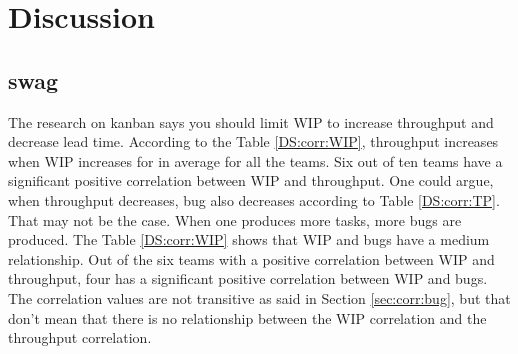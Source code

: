 \documentclass[UKenglish]{ifimaster}  %
\begin{document}
 
 \chapter{Discussion}
 \label{ch:discussion} 
 \section{swag}
 The research on kanban says you should limit WIP to increase throughput and decrease lead time. According to the Table \ref{DS:corr:WIP}, throughput increases when WIP increases for in average for all the teams.  Six out of ten teams have a significant positive correlation between WIP and throughput. One could argue, when throughput decreases, bug also decreases according to Table \ref{DS:corr:TP}. That may not be the case. When one produces more tasks, more bugs are produced. The Table \ref{DS:corr:WIP} shows that WIP and bugs have a medium relationship. Out of the six teams with a positive correlation between WIP and throughput, four has a significant positive correlation between WIP and bugs. The correlation values are not transitive as said in Section \ref{sec:corr:bug}, but that don't mean that there is no relationship between the WIP correlation and the throughput correlation. 
 

 
 
\end{document}
